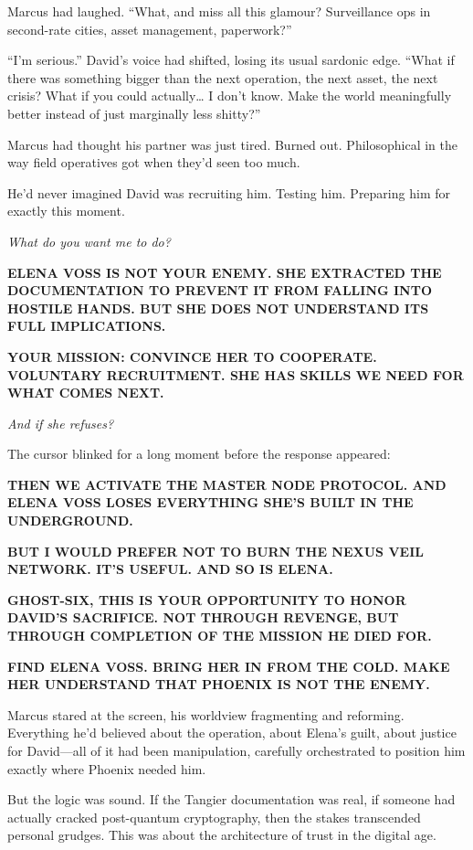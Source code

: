 Marcus had laughed. ``What, and miss all this glamour? Surveillance ops in second-rate cities, asset management, paperwork?''

``I'm serious.'' David's voice had shifted, losing its usual sardonic edge. ``What if there was something bigger than the next operation, the next asset, the next crisis? What if you could actually\ldots{} I don't know. Make the world meaningfully better instead of just marginally less shitty?''

Marcus had thought his partner was just tired. Burned out. Philosophical in the way field operatives got when they'd seen too much.

He'd never imagined David was recruiting him. Testing him. Preparing him for exactly this moment.

\emph{What do you want me to do?}

\textbf{ELENA VOSS IS NOT YOUR ENEMY. SHE EXTRACTED THE DOCUMENTATION TO PREVENT IT FROM FALLING INTO HOSTILE HANDS. BUT SHE DOES NOT UNDERSTAND ITS FULL IMPLICATIONS.}

\textbf{YOUR MISSION: CONVINCE HER TO COOPERATE. VOLUNTARY RECRUITMENT. SHE HAS SKILLS WE NEED FOR WHAT COMES NEXT.}

\emph{And if she refuses?}

The cursor blinked for a long moment before the response appeared:

\textbf{THEN WE ACTIVATE THE MASTER NODE PROTOCOL. AND ELENA VOSS LOSES EVERYTHING SHE'S BUILT IN THE UNDERGROUND.}

\textbf{BUT I WOULD PREFER NOT TO BURN THE NEXUS VEIL NETWORK. IT'S USEFUL. AND SO IS ELENA.}

\textbf{GHOST-SIX, THIS IS YOUR OPPORTUNITY TO HONOR DAVID'S SACRIFICE. NOT THROUGH REVENGE, BUT THROUGH COMPLETION OF THE MISSION HE DIED FOR.}

\textbf{FIND ELENA VOSS. BRING HER IN FROM THE COLD. MAKE HER UNDERSTAND THAT PHOENIX IS NOT THE ENEMY.}

Marcus stared at the screen, his worldview fragmenting and reforming. Everything he'd believed about the operation, about Elena's guilt, about justice for David---all of it had been manipulation, carefully orchestrated to position him exactly where Phoenix needed him.

But the logic was sound. If the Tangier documentation was real, if someone had actually cracked post-quantum cryptography, then the stakes transcended personal grudges. This was about the architecture of trust in the digital age.

